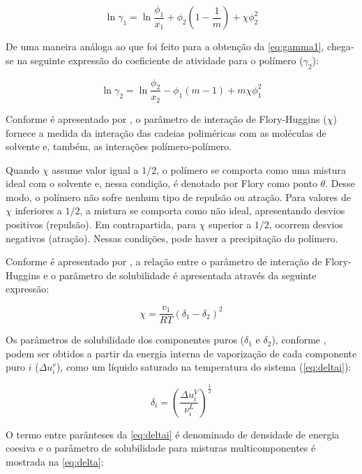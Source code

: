 \begin{equation}\label{eq:gamma1}
\ln\gamma_1 = \ln\frac{\phi_1}{x_1} + \phi_2\left( 1 - \frac{1}{m} \right) +
\chi\phi_2^2
\end{equation}

De uma maneira análoga ao que foi feito para a obtenção da \autoref{eq:gamma1},
chega-se na seguinte expressão do coeficiente de atividade para o polímero
($\gamma_2$):

\begin{equation}
\ln\gamma_2 = \ln\frac{\phi_2}{x_2} - \phi_1\left( m - 1 \right) +
m\chi\phi_1^2
\end{equation}

Conforme é apresentado por , o parâmetro de interação de
Flory-Huggins ($\chi$) fornece a medida da interação das cadeias poliméricas com as moléculas de solvente e, também, as interações
polímero-polímero. 

Quando $\chi$ assume valor igual a $1/2$, o polímero se comporta
como uma mistura ideal com o solvente e, nessa condição, é denotado por Flory
como ponto $\theta$. Desse modo, o polímero não sofre nenhum tipo de repulsão ou
atração. Para valores de $\chi$ inferiores a $1/2$, a mistura
se comporta como não ideal, apresentando desvios positivos (repulsão). 
Em contrapartida, para $\chi$ superior a $1/2$, ocorrem desvios negativos
(atração). Nessas condições, pode haver a precipitação do polímero.

Conforme é apresentado por , a relação entre o parâmetro
de interação de Flory-Huggins e o parâmetro de solubilidade é apresentada
através da seguinte expressão:

\begin{equation}
\chi = \frac{v_1}{RT}\left( \delta_1 - \delta_2 \right)^2
\end{equation}

Os parâmetros
de solubilidade dos componentes puros ($\delta_1$ e $\delta_2$), conforme
, podem ser obtidos a partir da energia interna de
vaporização de cada componente puro $i$ ($\Delta u_i^v$), como um líquido saturado na temperatura do sistema
(\autoref{eq:deltai}):

\begin{equation}\label{eq:deltai}
\delta_i = \left ( \frac{\Delta u_i^V}{\nu_i^L} \right )^{\frac{1}{2}}
\end{equation}

O termo entre parânteses da \autoref{eq:deltai} é denominado de densidade de energia
coesiva e o parâmetro de solubilidade para misturas multicomponentes é mostrada
na \autoref{eq:delta}:

